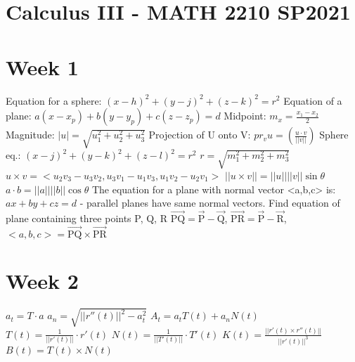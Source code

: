 \documentclass[12pt]{article}
\begin{document}
    \section*{Calculus III - MATH 2210 SP2021}
    \begin{paracol}{2}
        \section*{Week 1}
        Equation for a sphere: $(x-h)^2+(y-j)^2+(z-k)^2=r^2$ \newline
        Equation of a plane: $a(x-x_p)+b(y-y_p)+c(z-z_p)=d$ \newline
        Midpoint: $m_x=\frac{x_1-x_2}{2}$\newline
        Magnitude: $|u| = \sqrt{u_1^2 + u_2^2 + u_3^2}$ \newline
        Projection of U onto V: \newline
        $pr_{v}u=( \frac{u \cdot v}{||v||} )$ \newline
        Sphere eq.: $(x-j)^2 +(y-k)^2 + (z-l)^2 = r^2$ \newline $r=\sqrt{m_1^2 + m_2^2 + m_3^2}$ \newline
        $u \times v = <u_2 v_3 - u_3 v_2, u_3 v_1 - u_1 v_3 , u_1 v_2 - u_2 v_1 >$ \newline
        $||u \times v|| = ||u||||v||\sin \theta$ \newline
        $a \cdot b = ||a||||b|| \cos \theta$ \newline
        The equation for a plane with normal vector <a,b,c> is: \newline
        $ax+by+cz=d$ - parallel planes have same normal vectors. \newline
        Find equation of plane containing three points P, Q, R \newline
        $\overrightarrow{\text{PQ}} = \overrightarrow{\text{P}} - \overrightarrow{\text{Q}}$,
        $\overrightarrow{\text{PR}} = \overrightarrow{\text{P}} - \overrightarrow{\text{R}}$, $<a,b,c> = \overrightarrow{\text{PQ}} \times \overrightarrow{\text{PR}}$

        \section*{Week 2}
        $a_t = T \cdot a$ \newline
        $a_n = \sqrt{||r''(t)||^2 - a_t^2}$ \newline
        $A_t = a_t T(t) + a_n N(t)$ \newline
        $T(t) = \frac{1}{||r'(t)||} \cdot r'(t)$ \newline
        $N(t) = \frac{1}{||T'(t)||} \cdot T'(t)$ \newline
        $K(t) = \frac{||r'(t) \times r''(t)||}{||r'(t)||^3}$ \newline
        $B(t) = T(t) \times N(t)$


\end{paracol}
\end{document}
